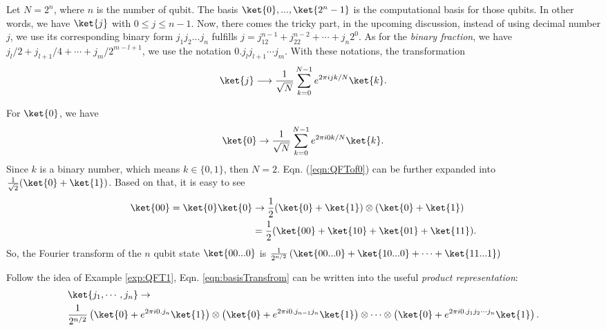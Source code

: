 Let $N=2^n$, where $n$ is the number of qubit. The basis $\ket{0}, ...,\ket{2^n-1}$ is the computational basis for those qubits. In other words, we have $\ket{j}$ with $0 \le j\le n-1$. Now, there comes the tricky part, in the upcoming discussion, instead of using decimal number $j$, we use its corresponding binary form $j_1j_2...j_n$ fulfills $j=j_12^{n-1}+j_22^{n-2}+\cdots+j_n2^0$. As for the \textit{binary fraction}, we have $j_l/2+j_{l+1}/4+\cdots+j_m/2^{m-l+1}$, we use the notation $0.j_lj_{l+1}\cdots j_m$. With these notations, the transformation
\begin{equation}
    \ket{j}\longrightarrow\frac{1}{\sqrt{N}}\sum_{k=0}^{N-1}e^{2\pi ijk/N}\ket{k}.
    \label{eqn:basisTransfrom}
\end{equation}
\begin{example}
    For $\ket{0}$, we have
    \begin{equation}
        \ket{0}\rightarrow\frac{1}{\sqrt{N}}\sum_{k=0}^{N-1}e^{2\pi i 0 k/N}\ket{k}.
        \label{eqn:QFTof0}
    \end{equation}
    Since $k$ is a binary number, which means $k\in \{0,1\}$, then $N=2$. Eqn. (\ref{eqn:QFTof0}) can be further expanded into $\frac{1}{\sqrt{2}}(\ket{0}+\ket{1})$. Based on that, it is easy to see
    \begin{equation}
        \begin{split}
            \ket{00}=\ket{0}\ket{0}&\rightarrow\frac{1}{2}(\ket{0}+\ket{1})\otimes(\ket{0}+\ket{1}) \\
            &=\frac{1}{2}(\ket{00}+\ket{10}+\ket{01}+\ket{11}).
        \end{split}
    \end{equation}
    So, the Fourier transform of the $n$ qubit state $\ket{00...0}$ is $\frac{1}{2^{n/2}}\left(\ket{00...0}+\ket{10...0}+\cdots+\ket{11...1}\right)$
    \label{exp:QFT1}
\end{example}
Follow the idea of Example \ref{exp:QFT1}, Eqn. \ref{eqn:basisTransfrom} can be written into the useful \textit{product representation}:
\begin{equation}
    \begin{split}
        &\ket{j_1,\cdots,j_n}\rightarrow\\
        &\frac{1}{2^{n/2}}\left(\ket{0}+e^{2\pi i0.j_n}\ket{1}\right)\otimes\left(\ket{0}+e^{2\pi i0.j_{n-1}j_n}\ket{1}\right)\otimes\cdots\otimes\left(\ket{0}+e^{2\pi i0.j_1j_2\cdots j_n}\ket{1}\right).
    \end{split}   
   \label{eqn:ProductRepre}
\end{equation}
